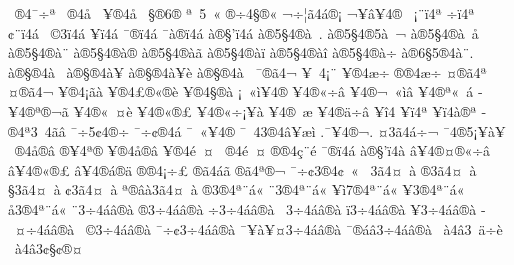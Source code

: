 {^^a0^^ae4^^af^^f7^^aa
^^a0^^ae4^^e5^^a0
^^a5^^ae4^^e5^^a0
^^a7^^ae6^^ae
^^aa^^a05^^ad^^a0^^ab
^^ae^^f74^^a7^^ae^^ab
^^ac^^f7^^a6^^e34^^e1^^ae^^a1
^^ac^^a5^^e2^^a54^^ae
^^a0^^a1^^a8^^ef4^^aa
^^ad^^f7^^ef4^^aa
^^a2^^a8^^ef4^^e1^^ad
^^ad^^a0^^a93^^ef4^^e1^^ad
^^ad^^a5^^ef4^^e1^^ad
^^af^^ae^^ef4^^e1^^ad
^^af^^e0^^ae^^ef4^^e1^^ad
^^e0^^ae^^a7'^^ef4^^e1^^ad
^^e0^^ae5^^a74^^ae^^e0^^a0.    
^^e0^^ae5^^a74^^ae5^^e0^^a0^^ac    
^^e0^^ae5^^a74^^ae^^e0^^a0^^e5    
^^e0^^ae5^^a74^^ae^^e0^^a8     
^^e0^^ae5^^a74^^ae^^e0^^ae     
^^e0^^ae5^^a74^^ae^^e0^^e3     
^^e0^^ae5^^a74^^ae^^e0^^ef     
^^e0^^ae5^^a74^^ae^^e0^^ee     
^^e0^^ae5^^a74^^ae^^e0^^f7     
^^e0^^ae6^^a75^^ae4^^e0^^a8.   
^^e0^^ae^^a7^^ae4^^e0^^a0     
^^e0^^ae^^a7^^ae4^^e0^^a5      
^^e0^^ae^^a7^^ae4^^e0^^a5^^e8     
^^e0^^ae^^a7^^ae4^^e0^^ad
^^ad^^a0^^af^^ae^^e34^^ac
^^ad^^a5^^a04^^a1^^a8      
^^a5^^ae4^^e6^^f7^^ad
^^ae^^ae4^^e6^^f7^^ad
^^a4^^ae^^e34^^aa
^^a4^^ae^^e34^^ac
^^a5^^ae4^^a1^^e3^^e0
^^a5^^ae4^^a3^^ae^^ab^^ae^^e8
^^a5^^ae4^^a7^^ae^^e0
^^a1^^a0^^ab^^ec^^ad^^a54^^ae
^^ad^^a54^^ae^^ab^^f7^^e2
^^ad^^a54^^ae^^ac^^a0^^ab^^ec^^e2
^^ad^^a54^^ae^^aa^^ab^^a0^^e1
^^ad^^a54^^ae^^aa^^ae^^ac^^e3^^ad
^^ad^^a54^^ae^^ab^^a0^^ad^^a4^^e8
^^ad^^a54^^ae^^ab^^ae^^a3
^^ad^^a54^^ae^^ab^^f7^^a1^^a5^^e0
^^ad^^a54^^ae^^ad^^a0^^e6
^^ad^^a54^^ae^^e4^^f7^^e2
^^ad^^a5^^ee4^^ad
^^ad^^a5^^ef4^^aa
^^ad^^a5^^ef4^^e0^^ae^^aa 
^^ad^^ae4^^aa3^^a04^^e3^^e2 
^^af^^f75^^a24^^ae^^ad^^f7
^^af^^f7^^a2^^ae4^^e1
^^af^^a0^^ab^^a54^^ae
^^af^^a04^^ad3^^ae4^^e2^^a5^^e6^^ec
.^^af^^a54^^ae^^ac.
^^a43^^e34^^e1^^f7^^ac
^^af4^^ae5^^a1^^a5^^e0^^a5
^^a0^^ae4^^e5^^ae^^e2
^^ae^^a54^^aa^^ae
^^a5^^ae4^^e5^^ae^^e2
^^a5^^ae4^^e9^^a0^^a4
^^a0^^ae4^^e9^^a0^^a4
^^ae^^ae4^^e7^^a8^^e9
^^af^^ae^^ef4^^e1
^^e0^^ae^^a7'^^ef4^^e0
^^e2^^a54^^ae^^a4^^ae^^ab^^f7^^e2
^^e2^^a54^^ae^^ab^^ae^^a3
^^e2^^a54^^ae^^e1^^ae^^e4
^^ae^^ae4^^a1^^f7^^a3
^^ae^^e34^^e1^^e3^^ad
^^ae^^e34^^aa^^ae^^ac
^^af^^f7^^a23^^ae4^^a2^^a0^^ab
^^a03^^e34^^a4^^a0^^e0
^^ae3^^e34^^a4^^a0^^e0
^^a73^^e34^^a4^^a0^^e0
^^a23^^e34^^a4^^a0^^e0
^^aa^^ae^^ad^^e2^^e03^^e34^^a4^^a0^^e0
^^ae3^^ae4^^aa^^a8^^e1^^ab
^^a83^^ae4^^aa^^a8^^e1^^ab
^^a5^^ad^^ec7^^ae4^^aa^^a8^^e1^^ab
^^a53^^ae4^^aa^^a8^^e1^^ab
^^e53^^ae4^^aa^^a8^^e1^^ab
^^a83^^f74^^e1^^e2^^ae^^e0
^^ae3^^f74^^e1^^e2^^ae^^e0
^^f73^^f74^^e1^^e2^^ae^^e0
^^a03^^f74^^e1^^e2^^ae^^e0
^^ef3^^f74^^e1^^e2^^ae^^e0
^^a53^^f74^^e1^^e2^^ae^^e0
^^ad^^a0^^a4^^f74^^e1^^e2^^ae^^e0
^^ad^^a0^^a93^^f74^^e1^^e2^^ae^^e0
^^af^^f7^^a23^^f74^^e1^^e2^^ae^^e0
^^af^^a5^^e0^^a5^^a43^^f74^^e1^^e2^^ae^^e0
^^af^^ae^^e1^^e23^^f74^^e1^^e2^^ae^^e0
^^a0^^e04^^e23^^a0^^e4^^f7^^e8
^^a0^^e04^^e23^^a2^^a7^^a2^^ae^^a4
}
